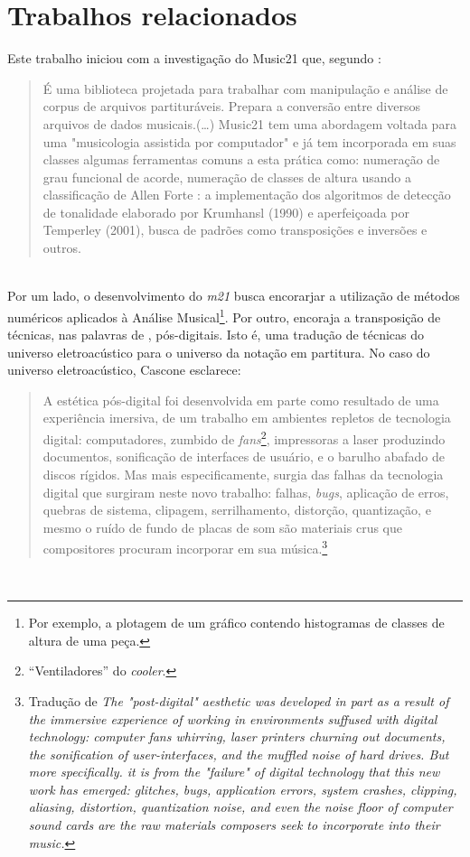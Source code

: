 \section{Trabalhos relacionados}\label{sec:trabalhos}

Este trabalho iniciou com a investigação do Music21 que, segundo \cite{soares_luteria_2015}:
\ \\
\begin{quote}
É uma biblioteca projetada para trabalhar com manipulação e análise de corpus de arquivos partituráveis. Prepara a conversão entre diversos arquivos de dados musicais.(\ldots) Music21 tem uma abordagem voltada para uma "musicologia assistida por computador" e já tem incorporada em suas classes algumas ferramentas comuns a esta prática como: numeração de grau funcional de acorde, numeração de classes de altura usando a classificação de Allen Forte : a implementação dos algoritmos de detecção de tonalidade elaborado por Krumhansl (1990) e aperfeiçoada por Temperley (2001), busca de padrões como transposições e inversões e outros.\cite[p.~71-72]{soares_luteria_2015}
\end{quote}
\ \\

Por um lado, o desenvolvimento do \emph{m21} busca encorarjar a utilização de métodos numéricos aplicados à Análise Musical\footnote{Por exemplo, a plotagem de um gráfico contendo histogramas de classes de altura de uma peça.}. Por outro, encoraja a transposição de técnicas, nas palavras de  \cite{cascone_aesthetics_2000}, pós-digitais. Isto é, uma tradução de técnicas do universo eletroacústico para o universo da notação em partitura. No caso do universo eletroacústico, Cascone esclarece:
\ \\

\begin{quote}
A estética pós-digital foi desenvolvida em parte como resultado de uma experiência imersiva, de um trabalho em ambientes repletos de tecnologia digital: computadores, zumbido de \emph{fans}\footnote{``Ventiladores'' do \emph{cooler}.}, impressoras a laser produzindo documentos, sonificação de interfaces de usuário, e o barulho abafado de discos rígidos. Mas mais especificamente, surgia das falhas da tecnologia digital que surgiram neste novo trabalho: falhas, \emph{bugs}, aplicação de erros, quebras de sistema, clipagem, serrilhamento, distorção, quantização, e mesmo o ruído de fundo de placas de som são materiais crus que compositores procuram incorporar em sua música.\cite[p.~393]{cascone_aesthetics_2000}\footnote{Tradução de \emph{The "post-digital" aesthetic was developed in part as a result of the immersive experience of working in environments suffused with digital technology: computer fans whirring, laser printers churning out documents, the sonification of user-interfaces, and the muffled noise of hard drives. But more specifically. it is from the "failure" of digital technology that this new work has emerged: glitches, bugs, application errors, system crashes, clipping, aliasing, distortion, quantization noise, and even the noise floor of computer sound cards are the raw materials composers seek to incorporate into their music.}}
\end{quote}
\ \\

